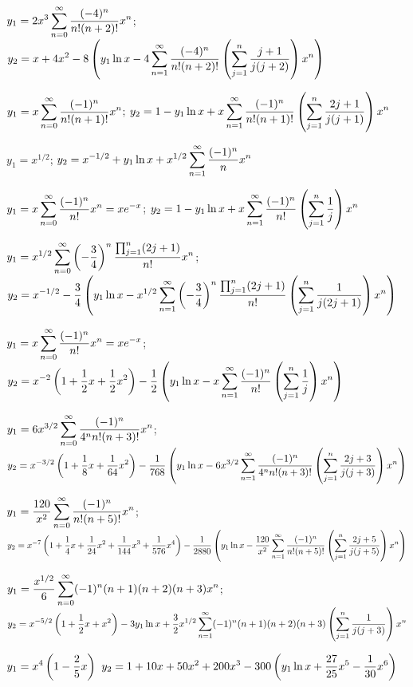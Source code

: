 
$\displaystyle{y_1=2x^3\sum_{n=0}^\infty \frac{(-4)^n}{n!(n+2)!}x^n}$;\;
$\displaystyle{y_2=x+4x^2-8\left(y_1\ln x-4\sum_{n=1}^\infty\frac{(-4)^n}{n!(n+2)!}\left(\sum_{j=1}^n\frac{j+1}{j(j+2)}\right)x^n\right)}$

$\displaystyle{y_1=x\sum_{n=0}^\infty\frac{(-1)^n}{n!(n+1)!}x^n}$;\;
$\displaystyle{y_2=1-y_1\ln x
+x\sum_{n=1}^\infty\frac{(-1)^n}{n!(n+1)!}\left(\sum_{j=1}^n\frac{2j+1}{j(j+1)}\right)x^n}$

$y_1=x^{1/2}$;\;   $\displaystyle{y_2=x^{-1/2}+y_1\ln
x+x^{1/2}\sum_{n=1}^\infty\frac{(-1)^n}{n}x^n}$

$\displaystyle{y_1=x\sum_{n=0}^\infty\frac{(-1)^n}{n!}x^n=xe^{-x}}$;\;
$\displaystyle{y_2=1-y_1\ln x+x\sum_{n=1}^\infty\frac{(-1)^n}{n!}\left(\sum_{j=1}^n\frac{1}{j}\right)x^n}$\;

$\displaystyle{y_1=x^{1/2}\sum_{n=0}^\infty\left(-\frac{3}{4}\right)^n\frac{\prod_{j=1}^n(2j+1)}{n!}x^n}$;\;
$\displaystyle{y_2=x^{-1/2}-\frac{3}{4}\left(y_1\ln
x-x^{1/2}\sum_{n=1}^\infty\left(-\frac{3}{4}\right)^n\frac{\prod_{j=1}^n(2j+1)}{n!}\left(\sum_{j=1}^n\frac{1}{j(2j+1)}\right)x^n\right)}$

$\displaystyle{y_1=x\sum_{n=0}^\infty\frac{(-1)^n}{n!}x^n=xe^{-x}}$;\;
 $\displaystyle{y_2=x^{-2}\left(1+\frac{1}{2}x+\frac{1}{2}x^2\right)-\frac{1}{2}
\left(y_1\ln x-x\sum_{n=1}^\infty\frac{(-1)^n}{n!}\left(\sum_{j=1}^n\frac{1}{j}\right)x^n\right)}$\;

$\displaystyle{y_1=6x^{3/2}\sum_{n=0}^\infty
\frac{(-1)^n}{4^nn!(n+3)!}x^n}$;\;
$\displaystyle{y_2=x^{-3/2}\left(1+\frac{1}{8}x+\frac{1}{64}x^2\right)
-\frac{1}{768}\left(y_1\ln x-6x^{3/2}\sum_{n=1}^\infty
\frac{(-1)^n}{4^nn!(n+3)!}
\left(\sum_{j=1}^n\frac{2j+3}{j(j+3)}\right)x^n\right)}$

$\displaystyle y_1=\frac{120}{x^2}\sum_{n=0}^\infty\frac{(-1)^n}{n!(n+5)!}x^n$;
$\displaystyle y_2=x^{-7}\left(1+\frac{1}{4}x+\frac{1}{24}x^2+\frac{1}{144}x^3
+\frac{1}{576}x^4\right)-\frac{1}{2880}\left(y_1\ln x-\frac{120}{x^2}
\sum_{n=1}^\infty\frac{(-1)^n}{n!(n+5)!}\left(\sum_{j=1}^n\frac{2j+5}{j(j+5)}\right)x^n\right)$

$\displaystyle{y_1=\frac{x^{1/2}}{6}\sum_{n=0}^\infty(-1)^n(n+1)(n+2)(n+3)x^n}$;\;
$\displaystyle{y_2=x^{-5/2}\left(1+\frac{1}{2}x+x^2\right)-3y_1\ln x
+\frac{3}{2}x^{1/2}\sum_{n=1}^\infty(-1)^n(n+1)(n+2)(n+3)
\left(\sum_{j=1}^n\frac{1}{j(j+3)}\right)x^n}$

$\displaystyle{y_1=x^4\left(1-\frac{2}{5}x\right)}$\;
$\displaystyle{y_2=1+10x+50x^2+200x^3-300\left(y_1\ln
x+\frac{27}{25}x^5-\frac{1}{30}x^6\right)}$

